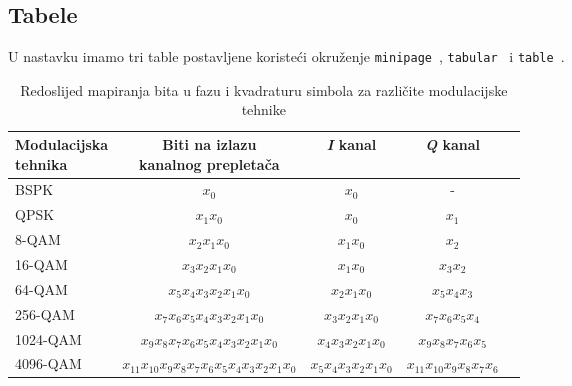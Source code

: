 \documentclass{article}
\newcommand{\plavo}[1]
{\texttt{\color{blue}#1\color{black}}~}
\begin{document}
\subsection{Tabele}
U nastavku imamo tri table postavljene koristeći okruženje {\plavo{minipage}}\space, {\plavo{tabular}} i {\plavo{table}}\space.
\begin{table}[!ht]
\centering
\small
\begin{tabular}{p{2.5cm} c c c c}
\hline
\hline
\rowcolor{tablecolor}
{\parbox{2cm}{\centering\color{white}Modulacijska\\ tehnika}} &
{\parbox{3cm}{\centering\color{white}Biti na izlazu\\ kanalnog prepletača}} &
{\parbox{2cm}{\centering\color{white}\textit{I} kanal}} & {\centering\parbox{2cm}{\color{white}\textit{Q} kanal}} \\ 
\hline
\hline
BSPK & $x_{0}$ & $x_{0}$ & - \\
\rowcolor[RGB]{242, 242, 242} QPSK & $x_{1}x_{0}$ & $x_{0}$ & $x_{1}$ \\
8-QAM & $x_{2}x_{1}x_{0}$ & $x_{1}x_{0}$ & $x_{2}$ \\
\rowcolor[RGB]{242, 242, 242} 16-QAM & $x_{3}x_{2}x_{1}x_{0}$ & $x_{1}x_{0}$ & $x_{3}x_{2}$ \\
64-QAM & $x_{5}x_{4}x_{3}x_{2}x_{1}x_{0}$ & $x_{2}x_{1}x_{0}$ & $x_{5}x_{4}x_{3}$ \\
\rowcolor[RGB]{242, 242, 242} 256-QAM & $x_{7}x_{6}x_{5}x_{4}x_{3}x_{2}x_{1}x_{0}$ & $x_{3}x_{2}x_{1}x_{0}$ & $x_{7}x_{6}x_{5}x_{4}$ \\
1024-QAM & $x_{9}x_{8}x_{7}x_{6}x_{5}x_{4}x_{3}x_{2}x_{1}x_{0}$ & $x_{4}x_{3}x_{2}x_{1}x_{0}$ & $x_{9}x_{8}x_{7}x_{6}x_{5}$ \\
\rowcolor[RGB]{242, 242, 242} 4096-QAM & $x_{11}x_{10}x_{9}x_{8}x_{7}x_{6}x_{5}x_{4}x_{3}x_{2}x_{1}x_{0}$ & $x_{5}x_{4}x_{3}x_{2}x_{1}x_{0}$ & $x_{11}x_{10}x_{9}x_{8}x_{7}x_{6}$\\
\hline
\hline
\end{tabular}
\caption{Redoslijed mapiranja bita u fazu i kvadraturu simbola za različite modulacijske tehnike}
\end{table}
\end{document}
